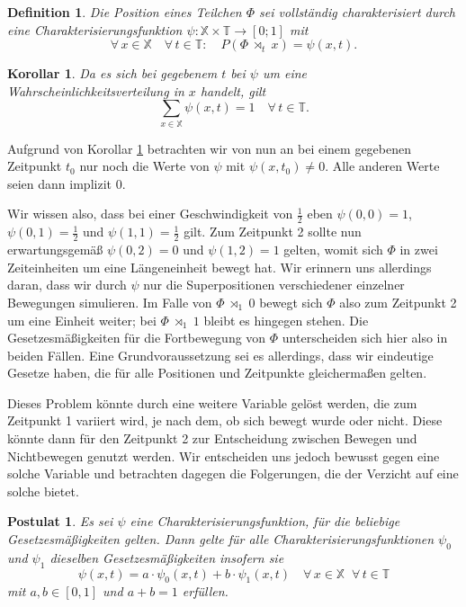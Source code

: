 \documentclass[a4paper,12pt,ngerman]{scrartcl}
\theoremstyle{plain}
\newtheorem{definition}{Definition}
\theoremstyle{plain}
\theoremstyle{plain}
\newtheorem{postulate}{Postulat}
\theoremstyle{plain}
\newtheorem{corollary}{Korollar}
\newcommand{\T}{\mathbb{T}}
\newcommand{\X}{\mathbb{X}}
\newcommand{\at}[1]{\;\rtimes_{#1}\;}
\begin{document}
{
\begin{definition}\label{def_psi}
Die Position eines Teilchen $\Phi$ sei vollständig charakterisiert durch eine Charakterisierungsfunktion $\psi: \X\times\T \rightarrow [0;1]$ mit
\[\forall\, x\in\X\quad\forall\, t\in\T:\quad
P(\Phi\at{t}x)=\psi(x,t).\]
\end{definition}
}

{
\begin{corollary}\label{cor_summe}
Da es sich bei gegebenem $t$ bei $\psi$ um eine Wahrscheinlichkeitsverteilung in $x$ handelt, gilt
\[\sum_{x\in\X} \psi(x,t)=1 \quad\forall\,t\in\T.\]
\end{corollary}
}

Aufgrund von Korollar \ref{cor_summe} betrachten wir von nun an bei einem gegebenen Zeitpunkt $t_0$ nur noch die Werte von $\psi$ mit $\psi(x,t_0)\neq0$. Alle anderen Werte seien dann implizit 0.

Wir wissen also, dass bei einer Geschwindigkeit von $\frac{1}{2}$  eben $\psi(0,0)=1$, $\psi(0,1)=\frac{1}{2}$ und $\psi(1,1)=\frac{1}{2}$ gilt. Zum Zeitpunkt 2 sollte nun erwartungsgemäß $\psi(0,2)=0$ und $\psi(1,2)=1$ gelten, womit sich $\Phi$ in zwei Zeiteinheiten um eine Längeneinheit bewegt hat. Wir erinnern uns allerdings daran, dass wir durch $\psi$ nur die Superpositionen verschiedener einzelner Bewegungen simulieren. Im Falle von $\Phi\at{1}0$ bewegt sich $\Phi$ also zum Zeitpunkt 2 um eine Einheit weiter; bei $\Phi\at{1}1$ bleibt es hingegen stehen. Die Gesetzesmäßigkeiten für die Fortbewegung von $\Phi$ unterscheiden sich hier also in beiden Fällen. Eine Grundvoraussetzung sei es allerdings, dass wir eindeutige Gesetze haben, die für alle Positionen und Zeitpunkte gleichermaßen gelten.

Dieses Problem könnte durch eine weitere Variable gelöst werden, die zum Zeitpunkt 1 variiert wird, je nach dem, ob sich bewegt wurde oder nicht. Diese könnte dann für den Zeitpunkt 2 zur Entscheidung zwischen Bewegen und Nichtbewegen genutzt werden. Wir entscheiden uns jedoch bewusst gegen eine solche Variable und betrachten dagegen die Folgerungen, die der Verzicht auf eine solche bietet.

{
\begin{postulate}\label{pos_einstein}
Es sei $\psi$ eine Charakterisierungsfunktion, für die beliebige Gesetzesmäßigkeiten gelten. Dann gelte für alle Charakterisierungsfunktionen $\psi_0$ und $\psi_1$ dieselben Gesetzesmäßigkeiten insofern sie
\[\psi(x,t)=a\cdot\psi_0(x,t)+b\cdot\psi_1(x,t)\quad\forall\,x\in\X\;\;\forall\,t \in\T\]
mit $a,b\in[0,1]$ und $a+b=1$ erfüllen.
\end{postulate}
}
\end{document}
